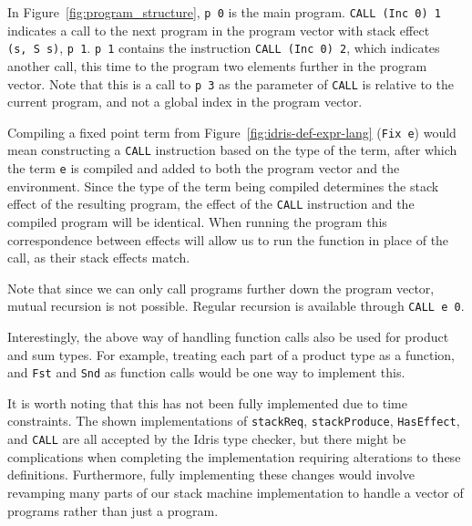 In Figure~\ref{fig:program_structure}, \texttt{p 0} is the main program. \texttt{CALL (Inc 0) 1} indicates a call to the next program in the program vector with stack effect \texttt{(s,~S~s)}, \texttt{p 1}. \texttt{p 1} contains the instruction \texttt{CALL (Inc 0) 2}, which indicates another call, this time to the program two elements further in the program vector. Note that this is a call to \texttt{p 3} as the parameter of \texttt{CALL} is relative to the current program, and not a global index in the program vector. 

Compiling a fixed point term from Figure~\ref{fig:idris-def-expr-lang} (\texttt{Fix e}) would mean constructing a \texttt{CALL} instruction based on the type of the term, after which the term \texttt{e} is compiled and added to both the program vector and the environment. Since the type of the term being compiled determines the stack effect of the resulting program, the effect of the \texttt{CALL} instruction and the compiled program will be identical. When running the program this correspondence between effects will allow us to run the function in place of the call, as their stack effects match.

Note that since we can only call programs further down the program vector, mutual recursion is not possible. Regular recursion is available through \texttt{CALL~e~0}.

Interestingly, the above way of handling function calls also be used for product and sum types. For example, treating each part of a product type as a function, and \texttt{Fst} and \texttt{Snd} as function calls would be one way to implement this.

It is worth noting that this has not been fully implemented due to time constraints. The shown implementations of \texttt{stackReq}, \texttt{stackProduce}, \texttt{HasEffect}, and \texttt{CALL} are all accepted by the Idris type checker, but there might be complications when completing the implementation requiring alterations to these definitions. Furthermore, fully implementing these changes would involve revamping many parts of our stack machine implementation to handle a vector of programs rather than just a program.
